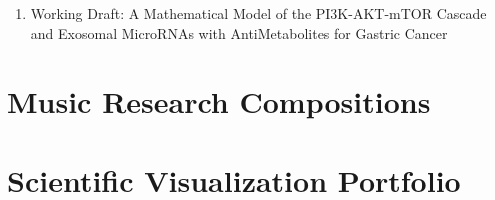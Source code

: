 \documentclass{ResumeDesignFormat1}
\begin{document}
\begin{enumerate}
\item Working Draft: A Mathematical Model of the PI3K-AKT-mTOR Cascade and Exosomal MicroRNAs with AntiMetabolites for Gastric Cancer
\end{enumerate}
\section{Music Research Compositions}

\begin{enumerate}
\end{enumerate}

\section{Scientific Visualization Portfolio}
\end{document}
